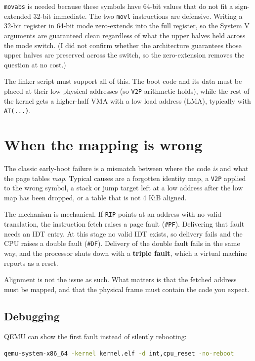 \texttt{movabs} is needed because these symbols have 64-bit values that do not fit a sign-extended 32-bit immediate. The two \texttt{movl} instructions are defensive. Writing a 32-bit register in 64-bit mode zero-extends into the full register, so the System V arguments are guaranteed clean regardless of what the upper halves held across the mode switch. (I did not confirm whether the architecture guarantees those upper halves are preserved across the switch, so the zero-extension removes the question at no cost.)

The linker script must support all of this. The boot code and its data must be placed at their low physical addresses (so \texttt{V2P} arithmetic holds), while the rest of the kernel gets a higher-half VMA with a low load address (LMA), typically with \texttt{AT(...)}.

\section{When the mapping is wrong}

The classic early-boot failure is a mismatch between where the code \emph{is} and what the page tables \emph{map}. Typical causes are a forgotten identity map, a \texttt{V2P} applied to the wrong symbol, a stack or jump target left at a low address after the low map has been dropped, or a table that is not 4 KiB aligned.

The mechanism is mechanical. If \texttt{RIP} points at an address with no valid translation, the instruction fetch raises a page fault (\texttt{\#PF}). Delivering that fault needs an IDT entry. At this stage no valid IDT exists, so delivery fails and the CPU raises a double fault (\texttt{\#DF}). Delivery of the double fault fails in the same way, and the processor shuts down with a \textbf{triple fault}, which a virtual machine reports as a reset.

Alignment is not the issue as such. What matters is that the fetched address must be mapped, and that the physical frame must contain the code you expect.

\subsection{Debugging}

QEMU can show the first fault instead of silently rebooting:

\begin{lstlisting}[language=bash]
qemu-system-x86_64 -kernel kernel.elf -d int,cpu_reset -no-reboot
\end{lstlisting}

